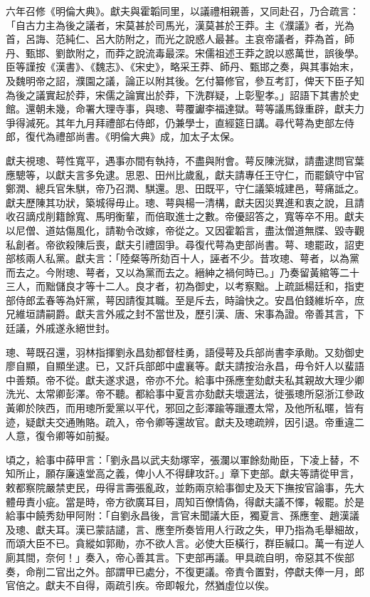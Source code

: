 \begin{pinyinscope}
六年召修《明倫大典》。獻夫與霍韜同里，以議禮相親善，又同赴召，乃合疏言：「自古力主為後之議者，宋莫甚於司馬光，漢莫甚於王莽。主《濮議》者，光為首，呂誨、范純仁、呂大防附之，而光之說惑人最甚。主哀帝議者，莽為首，師丹、甄邯、劉歆附之，而莽之說流毒最深。宋儒祖述王莽之說以惑萬世，誤後學。臣等謹按《漢書》、《魏志》、《宋史》，略采王莽、師丹、甄邯之奏，與其事始末，及魏明帝之詔，濮園之議，論正以附其後。乞付纂修官，參互考訂，俾天下臣子知為後之議實起於莽，宋儒之論實出於莽，下洗群疑，上彰聖孝。」詔語下其書於史館。還朝未幾，命署大理寺事，與璁、萼覆讞李福達獄。萼等議馬錄重辟，獻夫力爭得減死。其年九月拜禮部右侍郎，仍兼學士，直經筵日講。尋代萼為吏部左侍郎，復代為禮部尚書。《明倫大典》成，加太子太保。

獻夫視璁、萼性寬平，遇事亦間有執持，不盡與附會。萼反陳洸獄，請盡逮問官葉應驄等，以獻夫言多免逮。思恩、田州比歲亂，獻夫請專任王守仁，而罷鎮守中官鄭潤、總兵官朱騏，帝乃召潤、騏還。思、田既平，守仁議築城建邑，萼痛詆之。獻夫歷陳其功狀，築城得毋止。璁、萼與楊一清構，獻夫因災異進和衷之說，且請收召謫戍削籍餘寬、馬明衡輩，而倍取進士之數。帝優詔答之，寬等卒不用。獻夫以尼僧、道姑傷風化，請勒令改嫁，帝從之。又因霍韜言，盡汰僧道無牒、毀寺觀私創者。帝欲殺陳后喪，獻夫引禮固爭。尋復代萼為吏部尚書。萼、璁罷政，詔吏部核兩人私黨。獻夫言：「陸粲等所劾百十人，誣者不少。昔攻璁、萼者，以為黨而去之。今附璁、萼者，又以為黨而去之。縉紳之禍何時已。」乃奏留黃綰等二十三人，而黜儲良才等十二人。良才者，初為御史，以考察黜。上疏詆楊廷和，指吏部侍郎孟春等為奸黨，萼因請復其職。至是斥去，時論快之。安昌伯錢維圻卒，庶兄維垣請嗣爵。獻夫言外戚之封不當世及，歷引漢、唐、宋事為證。帝善其言，下廷議，外戚遂永絕世封。

璁、萼既召還，羽林指揮劉永昌劾都督桂勇，語侵萼及兵部尚書李承勛。又劾御史廖自顯，自顯坐逮。已，又訐兵部郎中盧襄等。獻夫請按治永昌，毋令奸人以蜚語中善類。帝不從。獻夫遂求退，帝亦不允。給事中孫應奎劾獻夫私其親故大理少卿洗光、太常卿彭澤。帝不聽。都給事中夏言亦劾獻夫壞選法，徙張璁所惡浙江參政黃卿於陜西，而用璁所愛黨以平代，邪回之彭澤踰等躐遷太常，及他所私暱，皆有迹，疑獻夫交通賄賂。疏入，帝令卿等還故官。獻夫及璁疏辨，因引退。帝重違二人意，復令卿等如前擬。

頃之，給事中薛甲言：「劉永昌以武夫劾塚宰，張瀾以軍餘劾勛臣，下凌上替，不知所止，願存廉遠堂高之義，俾小人不得肆攻訐。」章下吏部。獻夫等請從甲言，敕都察院嚴禁吏民，毋得言壽張亂政，並飭兩京給事御史及天下撫按官論事，先大體毋責小疵。當是時，帝方欲廣耳目，周知百僚情偽，得獻夫議不懌，報罷。於是給事中饒秀劾甲阿附：「自劉永昌後，言官未聞議大臣，獨夏言、孫應奎、趙漢議及璁、獻夫耳。漢已蒙詰譴，言、應奎所奏皆用人行政之失，甲乃指為毛舉細故，而頌大臣不已。貪縱如郭勛，亦不欲人言。必使大臣橫行，群臣緘口。萬一有逆人廁其間，奈何！」奏入，帝心善其言。下吏部再議。甲具疏自明，帝惡其不俟部奏，命削二官出之外。部謂甲已處分，不復更議。帝責令置對，停獻夫俸一月，郎官倍之。獻夫不自得，兩疏引疾。帝即報允，然猶虛位以俟。


\end{pinyinscope}
